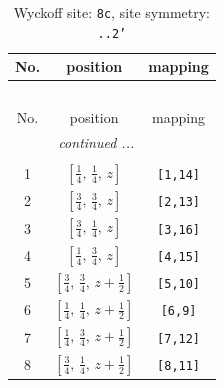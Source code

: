 \documentclass[fleqn,8pt]{jsarticle}
\begin{document}
\renewcommand{\arraystretch}{1.2}
\begin{longtable}{ccc}
\caption{Wyckoff site: {\tt 8c}, site symmetry: {\tt ..2'}}
 \\
 \hline \hline
No. & position & mapping \\ \hline \endfirsthead

\multicolumn{2}{l}{\tablename\ \thetable{}} \\
 \hline \hline
No. & position & mapping \\ \hline \endhead

 \hline \hline
\multicolumn{2}{r}{\footnotesize\it continued ...} \\ \endfoot

 \hline \hline
\multicolumn{2}{r}{} \\ \endlastfoot

1 & $\left[ \frac{1}{4},\, \frac{1}{4},\, z \right]$ & {\tt [1,14]} \\ \hline
2 & $\left[ \frac{3}{4},\, \frac{3}{4},\, z \right]$ & {\tt [2,13]} \\ \hline
3 & $\left[ \frac{3}{4},\, \frac{1}{4},\, z \right]$ & {\tt [3,16]} \\ \hline
4 & $\left[ \frac{1}{4},\, \frac{3}{4},\, z \right]$ & {\tt [4,15]} \\ \hline
5 & $\left[ \frac{3}{4},\, \frac{3}{4},\, z + \frac{1}{2} \right]$ & {\tt [5,10]} \\ \hline
6 & $\left[ \frac{1}{4},\, \frac{1}{4},\, z + \frac{1}{2} \right]$ & {\tt [6,9]} \\ \hline
7 & $\left[ \frac{1}{4},\, \frac{3}{4},\, z + \frac{1}{2} \right]$ & {\tt [7,12]} \\ \hline
8 & $\left[ \frac{3}{4},\, \frac{1}{4},\, z + \frac{1}{2} \right]$ & {\tt [8,11]} \\
\end{longtable}
\renewcommand{\arraystretch}{1.2}
\end{document}
